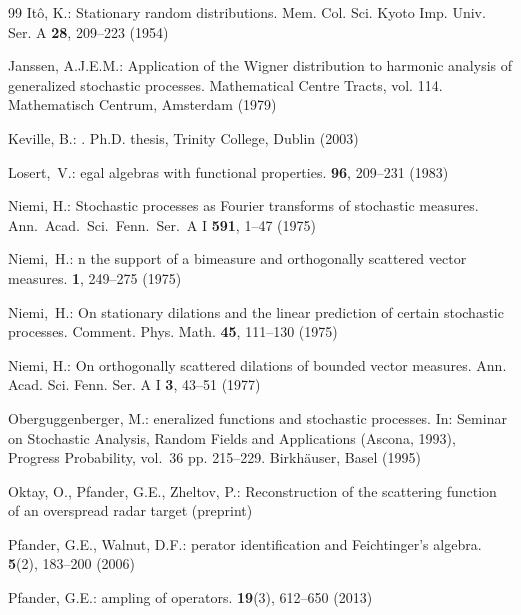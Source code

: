 \documentclass[graybox]{svmult}
\begin{document}
\begin{thebibliography}{99}
 It\^{o}, K.: Stationary random distributions.
   Mem. Col. Sci. Kyoto Imp. Univ. Ser. A {\bf 28},  209--223 (1954)

 Janssen, A.J.E.M.:
\newblock Application of the Wigner
   distribution to harmonic analysis of generalized stochastic
   processes.  Mathematical Centre Tracts, vol. 114. Mathematisch Centrum,
   Amsterdam (1979)

Keville, B.:
.
\newblock Ph.D. thesis, {T}rinity {C}ollege, {D}ublin (2003)

 {L}osert,~V.:
egal algebras with functional properties.
 {\bf 96}, 209--231 (1983)

 Niemi, H.:
\newblock Stochastic processes as Fourier
   transforms of stochastic measures.
   Ann.\  Acad.\  Sci.\  Fenn.\ Ser.\  A I {\bf 591},  1--47 (1975)

Niemi,~H.:
n the support of a bimeasure and
orthogonally scattered vector measures.
{\bf 1},  249--275 (1975)

 Niemi,~H.:
\newblock On stationary dilations and the linear
   prediction of certain stochastic processes.
    Comment.  Phys. Math.    {\bf 45},  111--130 (1975)

 Niemi, H.:
\newblock  On orthogonally scattered dilations of
   bounded vector measures.
    Ann.  Acad.  Sci.  Fenn. Ser.  A I {\bf 3},  43--51 (1977)

{O}berguggenberger, M.:
eneralized functions and stochastic processes.
\newblock In: {{S}eminar on {S}tochastic {A}nalysis, {R}andom {F}ields and
{A}pplications ({A}scona, 1993)},  {{P}rogress {P}robability}, vol.~36
pp. 215--229. {B}irkh{\"a}user, {B}asel (1995)

  Oktay, O., Pfander, G.E., Zheltov, P.:
   Reconstruction of the scattering function of an
   overspread radar target ({p}reprint) %

Pfander, G.E., Walnut, D.F.:
perator identification and {F}eichtinger's algebra.
 {\bf 5}(2), 183--200 (2006)

{P}fander, G.E.:
ampling of operators.
 {\bf 19}(3), 612--650 (2013)



\end{thebibliography}
\end{document}
